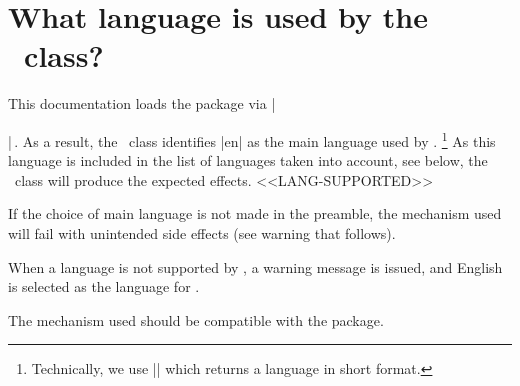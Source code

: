 \documentclass[10pt, a4paper]{tutodoc}
\begin{document}
\section{What language is used by the \thisproj\ class?}

This documentation loads the  package via \tdocinlatex|\usepackage[english]{babel}|\,.
As a result, the \thisproj\ class identifies \tdocinlatex|en| as the main language used by .%
\footnote{
	Technically, we use \tdocinlatex|| which returns a language in short format.
}
As this language is included in the list of languages taken into account, see below, the \thisproj\ class will produce the expected effects.
<<LANG-SUPPORTED>>


\begin{tdoccaut}
	If the choice of main language is not made in the preamble, the mechanism used will fail with unintended side effects (see warning that follows).
\end{tdoccaut}


\begin{tdocwarn}
    When a language is not supported by \thisproj, a warning message is issued, and English is selected as the language for \thisproj.
\end{tdocwarn}


\begin{tdocnote}
    The mechanism used should be compatible with the  package.
\end{tdocnote}
\end{document}
